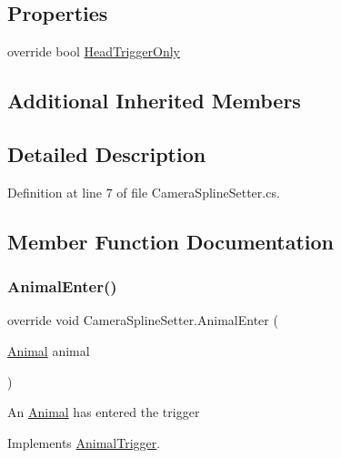 \subsection*{Properties}
\begin{DoxyCompactItemize}
\item 
override bool \mbox{\hyperlink{class_camera_spline_setter_af040b0c7da8b78dac794a5c6e04ce405}{Head\+Trigger\+Only}}
\end{DoxyCompactItemize}
\subsection*{Additional Inherited Members}


\subsection{Detailed Description}


Definition at line 7 of file Camera\+Spline\+Setter.\+cs.



\subsection{Member Function Documentation}
\mbox{\label{class_camera_spline_setter_a5669e29495356c82377ef7545cf29b3a}} 
\subsubsection{\texorpdfstring{Animal\+Enter()}{AnimalEnter()}}
{\footnotesize\ttfamily override void Camera\+Spline\+Setter.\+Animal\+Enter (\begin{DoxyParamCaption}\item[{\mbox{\hyperlink{class_animal}{Animal}}}]{animal }\end{DoxyParamCaption})\hspace{0.3cm}{\ttfamily [virtual]}}



An \mbox{\hyperlink{class_animal}{Animal}} has entered the trigger 



Implements \mbox{\hyperlink{class_animal_trigger_a03181803fa268e0bfcbdc752ee733c40}{Animal\+Trigger}}.



